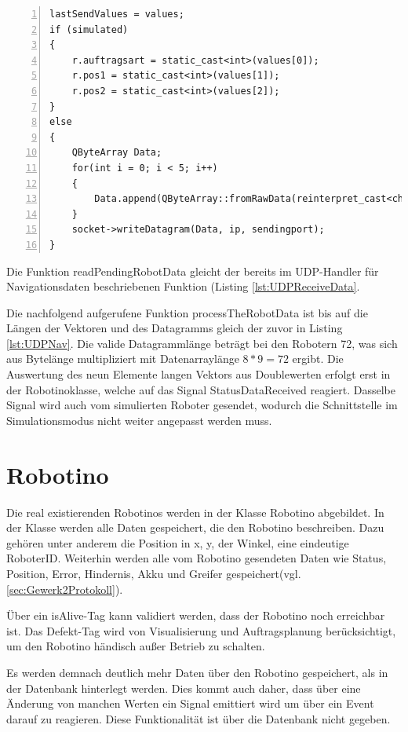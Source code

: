 \begin{lstlisting}[frame=single, breaklines=true, numbers=left, stepnumber=2, firstnumber=1, numberstyle = \tiny, caption=Daten über UDP verschicken,label=lst:UDPWriteData]
lastSendValues = values;
if (simulated)
{
    r.auftragsart = static_cast<int>(values[0]);
    r.pos1 = static_cast<int>(values[1]);
    r.pos2 = static_cast<int>(values[2]);
}
else
{
    QByteArray Data;
    for(int i = 0; i < 5; i++)
    {
        Data.append(QByteArray::fromRawData(reinterpret_cast<char*>(&values[i]), sizeof(values[i])));
    }
    socket->writeDatagram(Data, ip, sendingport);
}
\end{lstlisting}

Die Funktion readPendingRobotData gleicht der bereits im UDP-Handler für Navigationsdaten beschriebenen Funktion (Listing \ref{lst:UDPReceiveData}. 

Die nachfolgend aufgerufene Funktion processTheRobotData ist bis auf die Längen der Vektoren und des Datagramms gleich der zuvor in Listing \ref{lst:UDPNav}. Die valide Datagrammlänge beträgt bei den Robotern 72, was sich aus Bytelänge multipliziert mit Datenarraylänge $ 8 * 9 = 72$ ergibt. Die Auswertung des neun Elemente langen Vektors aus Doublewerten erfolgt erst in der Robotinoklasse, welche auf das Signal StatusDataReceived reagiert. Dasselbe Signal wird auch vom simulierten Roboter gesendet, wodurch die Schnittstelle im Simulationsmodus nicht weiter angepasst werden muss. 

\section{Robotino} 
\label{sec:Robotino}

Die real existierenden Robotinos werden in der Klasse Robotino abgebildet. In der Klasse werden alle Daten gespeichert, die den Robotino beschreiben. Dazu gehören unter anderem die Position in x, y, der Winkel, eine eindeutige RoboterID. Weiterhin werden alle vom Robotino gesendeten Daten wie Status, Position, Error, Hindernis, Akku und Greifer gespeichert(vgl. \ref{sec:Gewerk2Protokoll}). 

Über ein isAlive-Tag kann validiert werden, dass der Robotino noch erreichbar ist. Das Defekt-Tag wird von Visualisierung und Auftragsplanung berücksichtigt, um den Robotino händisch außer Betrieb zu schalten. 

Es werden demnach deutlich mehr Daten über den Robotino gespeichert, als in der Datenbank hinterlegt werden. Dies kommt auch daher, dass über eine Änderung von manchen Werten ein Signal emittiert wird um über ein Event darauf zu reagieren. Diese Funktionalität ist über die Datenbank nicht gegeben. 

